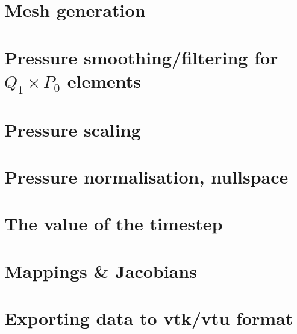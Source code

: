 \section{Mesh generation} \label{sec:meshes}  %
\newpage %
\section{Pressure smoothing/filtering for $Q_1\times P_0$ elements \label{psmoothing}} 
\newpage %
\section{Pressure scaling \label{pscaling}}  %
\newpage %
\section{Pressure normalisation, nullspace\label{ss_pnorm}}  %
\newpage %
\section{The value of the timestep}\label{ss:cfl}  %
\newpage %
\section{Mappings \& Jacobians \label{ss:mappings}}  %
\newpage %
\section{Exporting data to vtk/vtu format}  %
\newpage %
